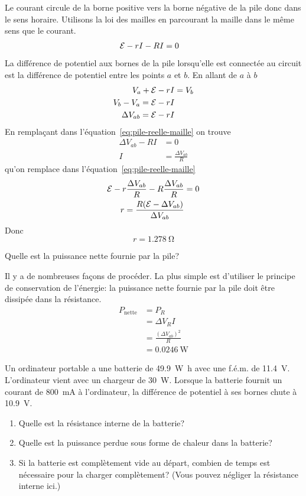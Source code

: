 Le courant circule de la borne positive vers la borne négative de la pile donc
dans le sens horaire. Utilisons la loi des mailles en parcourant la maille dans
le même sens que le courant.
\begin{align}
  \mathcal{E} - rI - RI &= 0
  \label{eq:pile-reelle-maille}
\end{align}
La différence de potentiel aux bornes de la pile lorsqu'elle est connectée au
circuit est la différence de potentiel entre les points $a$ et $b$. En allant
de $a$ à $b$
\begin{align}
  V_a + \mathcal{E} - rI &= V_b \nonumber \\
  V_b - V_a = \mathcal{E} - rI \nonumber \\
  \Delta V_{ab} = \mathcal{E} - rI \label{eq:pile-reelle-ddp}
\end{align}
En remplaçant dans l'équation~\ref{eq:pile-reelle-maille} on trouve
\begin{align*}
  \Delta V_{ab} - RI &= 0 \\
  I &= \frac{\Delta V_{ab}}{R}
\end{align*}
qu'on remplace dans l'équation~\ref{eq:pile-reelle-maille}
\begin{align*}
  \mathcal{E} - r \frac{\Delta V_{ab}}{R} - R \frac{\Delta V_{ab}}{R} &= 0 \\
  r = \frac{R(\mathcal{E} - \Delta V_{ab})}{\Delta V_{ab}}
\end{align*}
Donc
$$r = \SI{1.278}{\ohm}$$


Quelle est la puissance nette fournie par la pile?

Il y a de nombreuses façons de procéder. La plus simple est d'utiliser le
principe de conservation de l'énergie: la puissance nette fournie par la pile
doit être dissipée dans la résistance.
\begin{align*}
  P_\mathrm{nette} &= P_R \\
                   &= \Delta V_RI \\
                   &= \frac{(\Delta V_{ab})^2}{R} \\
                   &= \SI{0.0246}{\watt}
\end{align*}



\begin{diapobox}
  Un ordinateur portable a une batterie de \SI{49.9}{\watt\hour} avec une
  f.é.m. de \SI{11.4}{\volt}. L'ordinateur vient avec un chargeur de
  \SI{30}{\watt}. Lorsque la batterie fournit un courant de
  \SI{800}{\milli\ampere} à l'ordinateur, la différence de potentiel à ses
  bornes chute à \SI{10.9}{\volt}. 

  \begin{enumerate}
    \item Quelle est la résistance interne de la batterie?
    \item Quelle est la puissance perdue sous forme de chaleur dans la batterie?
    \item Si la batterie est complètement vide au départ, combien de temps est
      nécessaire pour la charger complètement? (Vous pouvez négliger la
      résistance interne ici.)
  \end{enumerate}
\end{diapobox}

